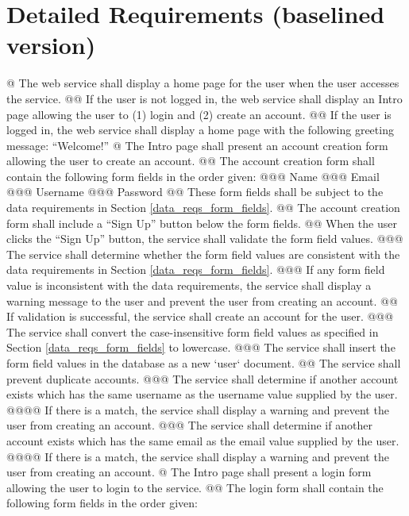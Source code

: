 \documentclass{article}
\begin{document}
\section*{Detailed Requirements (baselined version)}

\begin{easylist}[articletoc]

  @ The web service shall display a home page for the user when the user accesses the service.
  @@ If the user is not logged in, the web service shall display an Intro page allowing the user to (1) login and (2) create an account. 
  @@ If the user is logged in, the web service shall display a home page with the following greeting message: ``Welcome!''
  @ The Intro page shall present an account creation form allowing the user to create an account.
  @@ \label{form_fields} The account creation form shall contain the following form fields in the order given:
  @@@ Name
  @@@ Email
  @@@ Username
  @@@ Password
  @@ These form fields shall be subject to the data requirements in Section \ref{data_reqs_form_fields}.
  @@ The account creation form shall include a ``Sign Up'' button below the form fields.
  @@ When the user clicks the ``Sign Up'' button, the service shall validate the form field values.
  @@@ The service shall determine whether the form field values are consistent with the data requirements in Section \ref{data_reqs_form_fields}.
  @@@ If any form field value is inconsistent with the data requirements, the service shall display a warning message to the user and prevent the user from creating an account.
  @@ If validation is successful, the service shall create an account for the user.
  @@@ The service shall convert the case-insensitive form field values as specified in Section \ref{data_reqs_form_fields} to lowercase.
  @@@ The service shall insert the form field values in the database as a new `user` document.
  @@ The service shall prevent duplicate accounts.
  @@@ The service shall determine if another account exists which has the same username as the username value supplied by the user.
  @@@@ If there is a match, the service shall display a warning and prevent the user from creating an account.
  @@@ The service shall determine if another account exists which has the same email as the email value supplied by the user.
  @@@@ If there is a match, the service shall display a warning and prevent the user from creating an account.
  @ The Intro page shall present a login form allowing the user to login to the service.
  @@ The login form shall contain the following form fields in the order given:

\end{easylist}
\end{document}
